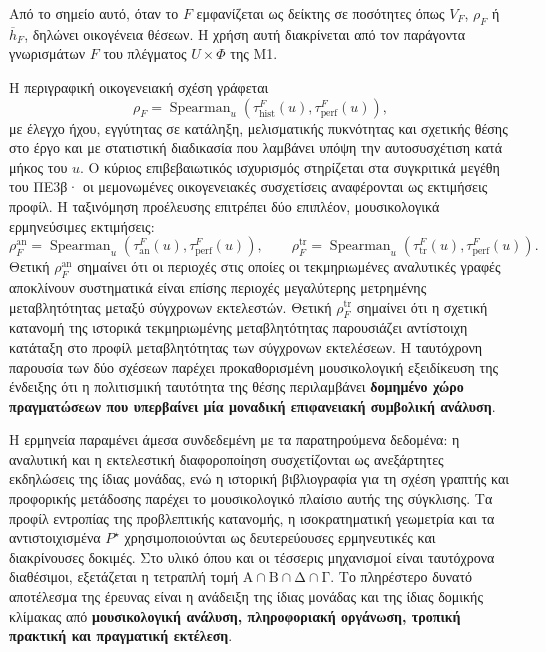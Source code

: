 \documentclass[11pt,a4paper]{article}
\begin{document}
Από το σημείο αυτό, όταν το $F$ εμφανίζεται ως δείκτης σε ποσότητες όπως $V_F$, $\rho_F$ ή $\overline h_F$, δηλώνει οικογένεια θέσεων. Η χρήση αυτή διακρίνεται από τον παράγοντα γνωρισμάτων $F$ του πλέγματος $U\times\Phi$ της M1.

Η περιγραφική οικογενειακή σχέση γράφεται
\[
\rho_F=\operatorname{Spearman}_{u}\!\left(\tau_{\mathrm{hist}}^{F}(u),\tau_{\mathrm{perf}}^{F}(u)\right),
\]
με έλεγχο ήχου, εγγύτητας σε κατάληξη, μελισματικής πυκνότητας και σχετικής θέσης στο έργο και με στατιστική διαδικασία που λαμβάνει υπόψη την αυτοσυσχέτιση κατά μήκος του $u$. Ο κύριος επιβεβαιωτικός ισχυρισμός στηρίζεται στα συγκριτικά μεγέθη του ΠΕ3β· οι μεμονωμένες οικογενειακές συσχετίσεις αναφέρονται ως εκτιμήσεις προφίλ. Η ταξινόμηση προέλευσης επιτρέπει δύο επιπλέον, μουσικολογικά ερμηνεύσιμες εκτιμήσεις:
\[
\rho_F^{\mathrm{an}}=\operatorname{Spearman}_{u}\!\left(\tau_{\mathrm{an}}^{F}(u),\tau_{\mathrm{perf}}^{F}(u)\right),
\qquad
\rho_F^{\mathrm{tr}}=\operatorname{Spearman}_{u}\!\left(\tau_{\mathrm{tr}}^{F}(u),\tau_{\mathrm{perf}}^{F}(u)\right).
\]
Θετική $\rho_F^{\mathrm{an}}$ σημαίνει ότι οι περιοχές στις οποίες οι τεκμηριωμένες αναλυτικές γραφές αποκλίνουν συστηματικά είναι επίσης περιοχές μεγαλύτερης μετρημένης μεταβλητότητας μεταξύ σύγχρονων εκτελεστών. Θετική $\rho_F^{\mathrm{tr}}$ σημαίνει ότι η σχετική κατανομή της ιστορικά τεκμηριωμένης μεταβλητότητας παρουσιάζει αντίστοιχη κατάταξη στο προφίλ μεταβλητότητας των σύγχρονων εκτελέσεων. Η ταυτόχρονη παρουσία των δύο σχέσεων παρέχει προκαθορισμένη μουσικολογική εξειδίκευση της ένδειξης ότι η πολιτισμική ταυτότητα της θέσης περιλαμβάνει \textbf{δομημένο χώρο πραγματώσεων που υπερβαίνει μία μοναδική επιφανειακή συμβολική ανάλυση}.

Η ερμηνεία παραμένει άμεσα συνδεδεμένη με τα παρατηρούμενα δεδομένα: η αναλυτική και η εκτελεστική διαφοροποίηση συσχετίζονται ως ανεξάρτητες εκδηλώσεις της ίδιας μονάδας, ενώ η ιστορική βιβλιογραφία για τη σχέση γραπτής και προφορικής μετάδοσης παρέχει το μουσικολογικό πλαίσιο αυτής της σύγκλισης. Τα προφίλ εντροπίας της προβλεπτικής κατανομής, η ισοκρατηματική γεωμετρία και τα αντιστοιχισμένα $P^{\star}$ χρησιμοποιούνται ως δευτερεύουσες ερμηνευτικές και διακρίνουσες δοκιμές.
Στο υλικό όπου και οι τέσσερις μηχανισμοί είναι ταυτόχρονα διαθέσιμοι, εξετάζεται η τετραπλή τομή \(\text{Α}\cap\text{Β}\cap\text{Δ}\cap\text{Γ}\). Το πληρέστερο δυνατό αποτέλεσμα της έρευνας είναι η ανάδειξη της ίδιας μονάδας και της ίδιας δομικής κλίμακας από \textbf{μουσικολογική ανάλυση, πληροφοριακή οργάνωση, τροπική πρακτική και πραγματική εκτέλεση}.
\end{document}
